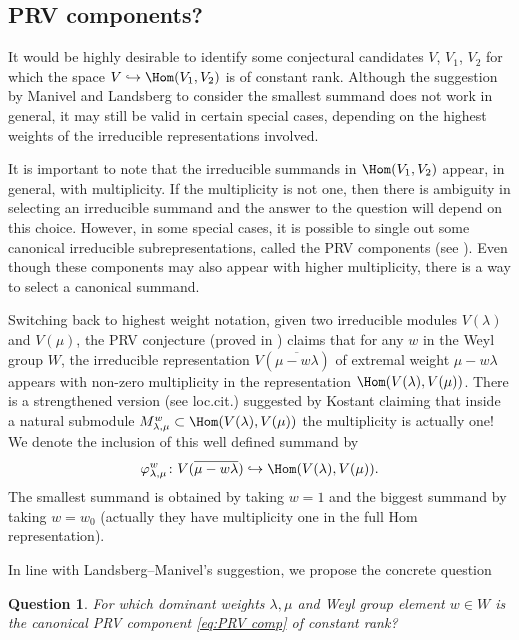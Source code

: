 \documentclass[reqno, 10pt]{amsart}
\theoremstyle{plain}
\newtheorem{question}[proposition]{Question}
\theoremstyle{definition}
\numberwithin{equation}{section}%
\begin{document}
\subsection{PRV components?}
It would be highly desirable to identify some conjectural candidates $V$, $V_1$, $V_2$ for which the space $V\hookrightarrow\Hom(V_1,V_2)$ is of constant rank. Although the suggestion by Manivel and Landsberg to consider the smallest summand does not work in general, it may still be valid in certain special cases, depending on the highest weights of the irreducible representations involved.

It is important to note that the irreducible summands in $\Hom(V_1,V_2)$ appear, in general, with multiplicity. If the multiplicity is not one, then there is ambiguity in selecting an irreducible summand and the answer to the question will depend on this choice.
However, in some special cases, it is possible to single out some canonical irreducible subrepresentations, called the PRV components (see \cite{Kumar-PRV}).
Even though these components may also appear with higher multiplicity, there is a way to select a canonical summand.

Switching back to highest weight notation, given two irreducible modules $V(\lambda)$ and $V(\mu)$, the PRV conjecture (proved in \cite{Kumar-PRV}) claims that for any $w$ in the Weyl group $W$, the irreducible representation $V(\overline{\mu-w\lambda})$ of extremal weight $\mu-w\lambda$ appears with non-zero multiplicity in the representation $\Hom(V(\lambda),V(\mu))$.
There is a strengthened version (see loc.cit.) suggested by Kostant claiming that inside a natural submodule $M_{\lambda,\mu}^w\subset \Hom(V(\lambda),V(\mu))$ the multiplicity is actually one!
We denote the inclusion of this well defined summand by
\begin{equation}	\label{eq:PRV comp}
\varphi_{\lambda,\mu}^w\colon V(\overline{\mu-w\lambda})\hookrightarrow\Hom(V(\lambda),V(\mu)).
\end{equation} 
The smallest summand is obtained by taking $w=1$ and the biggest summand by taking $w=w_0$ (actually they have multiplicity one in the full Hom representation).

In line with Landsberg--Manivel's suggestion, we propose the concrete question
\begin{question}
	For which dominant weights $\lambda,\mu$ and Weyl group element $w\in W$ is the canonical PRV component \eqref{eq:PRV comp}
	of constant rank?
\end{question}
\end{document}
